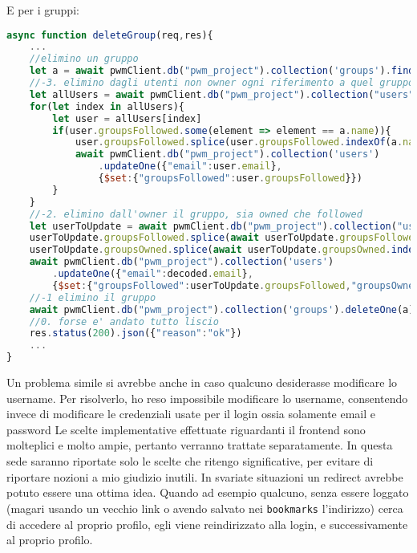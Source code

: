 E per i gruppi:
\begin{lstlisting}[language=JavaScript]
    async function deleteGroup(req,res){
    ...
    //elimino un gruppo
    let a = await pwmClient.db("pwm_project").collection('groups').findOne({"name": validator.escape(req.params.name)})
    //-3. elimino dagli utenti non owner ogni riferimento a quel gruppo
    let allUsers = await pwmClient.db("pwm_project").collection("users").find({"email":{$ne: decoded.email}}).toArray()
    for(let index in allUsers){
        let user = allUsers[index]
        if(user.groupsFollowed.some(element => element == a.name)){
            user.groupsFollowed.splice(user.groupsFollowed.indexOf(a.name),1)
            await pwmClient.db("pwm_project").collection('users')
                .updateOne({"email":user.email},
                {$set:{"groupsFollowed":user.groupsFollowed}})
        }
    }
    //-2. elimino dall'owner il gruppo, sia owned che followed
    let userToUpdate = await pwmClient.db("pwm_project").collection("users").findOne({"email":decoded.email})
    userToUpdate.groupsFollowed.splice(await userToUpdate.groupsFollowed.indexOf(a.name),1)
    userToUpdate.groupsOwned.splice(await userToUpdate.groupsOwned.indexOf(a.name),1)
    await pwmClient.db("pwm_project").collection('users')
        .updateOne({"email":decoded.email},
        {$set:{"groupsFollowed":userToUpdate.groupsFollowed,"groupsOwned":userToUpdate.groupsOwned}});
    //-1 elimino il gruppo
    await pwmClient.db("pwm_project").collection('groups').deleteOne(a)
    //0. forse e' andato tutto liscio
    res.status(200).json({"reason":"ok"})
    ...
}
\end{lstlisting}
\alert{Un problema simile si avrebbe anche in caso qualcuno desiderasse modificare lo username. Per risolverlo, ho reso impossibile modificare lo username, consentendo invece di modificare le credenziali usate per il login ossia solamente email e password}
Le scelte implementative effettuate riguardanti il frontend sono molteplici e molto ampie, pertanto verranno trattate separatamente. In questa sede saranno riportate solo le scelte che ritengo significative, per evitare di riportare nozioni a mio giudizio inutili.
In svariate situazioni un redirect avrebbe potuto essere una ottima idea. Quando ad esempio qualcuno, senza essere loggato (magari usando un vecchio link o avendo salvato nei \verb|bookmarks| l'indirizzo) cerca di accedere al proprio profilo, egli viene reindirizzato alla login, e successivamente al proprio profilo.

